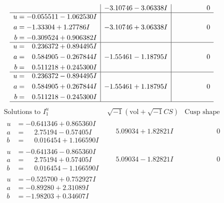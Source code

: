 \documentclass[1p]{elsarticle_modified}
\theoremstyle{definition}
\newcommand{\I}{\sqrt{-1}}
\begin{document}
$$\begin{array}{c|c|c}
 & -3.10746 - 3.06338 I & \phantom{-0.000000 } 0 \\ \hline\begin{aligned}
u &= -0.055511 - 1.062530 I \\
a &= -1.33304 + 1.27786 I \\
b &= -0.309524 + 0.906382 I\end{aligned}
 & -3.10746 + 3.06338 I & \phantom{-0.000000 } 0 \\ \hline\begin{aligned}
u &= \phantom{-}0.236372 + 0.894495 I \\
a &= \phantom{-}0.584905 - 0.267844 I \\
b &= \phantom{-}0.511218 + 0.245300 I\end{aligned}
 & -1.55461 - 1.18795 I & \phantom{-0.000000 } 0 \\ \hline\begin{aligned}
u &= \phantom{-}0.236372 - 0.894495 I \\
a &= \phantom{-}0.584905 + 0.267844 I \\
b &= \phantom{-}0.511218 - 0.245300 I\end{aligned}
 & -1.55461 + 1.18795 I & \phantom{-0.000000 } 0\\
 \hline 
 \end{array}$$\newpage$$\begin{array}{c|c|c}  
\text{Solutions to }I^u_{1}& \I (\text{vol} + \sqrt{-1}CS) & \text{Cusp shape}\\
 \hline 
\begin{aligned}
u &= -0.641346 + 0.865360 I \\
a &= \phantom{-}2.75194 - 0.57405 I \\
b &= \phantom{-}0.016454 + 1.166590 I\end{aligned}
 & \phantom{-}5.09034 + 1.82821 I & \phantom{-0.000000 } 0 \\ \hline\begin{aligned}
u &= -0.641346 - 0.865360 I \\
a &= \phantom{-}2.75194 + 0.57405 I \\
b &= \phantom{-}0.016454 - 1.166590 I\end{aligned}
 & \phantom{-}5.09034 - 1.82821 I & \phantom{-0.000000 } 0 \\ \hline\begin{aligned}
u &= -0.525700 + 0.752927 I \\
a &= -0.89280 + 2.31089 I \\
b &= -1.98203 + 0.34607 I\end{aligned}

\end{array}$$
\end{document}
